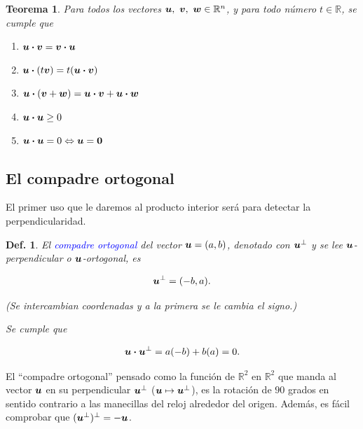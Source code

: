 \documentclass{article}
\theoremstyle{definicion}
\newtheorem{definicion}{Def.}
\theoremstyle{definition}             %
\theoremstyle{definition}             %
\theoremstyle{definition}
\theoremstyle{definition}
\theoremstyle{observacion}
\theoremstyle{definition}
\theoremstyle{plain}
\newtheorem{theorem}{Teorema}
\theoremstyle{definition}
\theoremstyle{afirmacion}
\theoremstyle{notation}
\theoremstyle{definition}
\begin{document}
        \begin{theorem}
            Para todos los vectores \(\vb*{u},\ \vb*{v},\ \vb*{w} \in \mathbb{R}^{n}\), y para todo número \(t \in \mathbb{R}\), se cumple que

            \begin{enumerate}[label = \textnormal{\Roman*)}]
                \item \(\vb*{u} \vdot \vb*{v} = \vb*{v} \vdot \vb*{u}\)
                \item \(\vb*{u} \vdot (t\vb*{v}) = t(\vb*{u} \vdot \vb*{v})\)
                \item \(\vb*{u} \vdot (\vb*{v} + \vb*{w}) = \vb*{u} \vdot \vb*{v} + \vb*{u} \vdot \vb*{w}\)
                \item \(\vb*{u} \vdot \vb*{u} \geq 0\)
                \item \(\vb*{u} \vdot \vb*{u} = 0 \Leftrightarrow \vb*{u} = \vb*{0}\)
            \end{enumerate}
        \end{theorem}

        \subsection{El compadre ortogonal}

        El primer uso que le daremos al producto interior será para detectar la perpendicularidad.

        \begin{definicion}
            El \textcolor{blue}{compadre ortogonal} del vector \(\vb*{u} = (a, b)\), denotado con \(\vb*{u}^{\perp}\) y se lee \(\vb*{u}\)-perpendicular o \(\vb*{u}\)-ortogonal, es

            \begin{equation*}
                \vb*{u}^{\perp} = (-b, a).
            \end{equation*}

            (Se intercambian coordenadas y a la primera se le cambia el signo.)

            Se cumple que 

            \begin{equation*}
                \vb*{u} \vdot \vb*{u}^{\perp} = a(-b) + b(a) = 0.
            \end{equation*}
        \end{definicion}

        El ``compadre ortogonal'' pensado como la función de \(\mathbb{R}^{2}\) en \(\mathbb{R}^{2}\) que manda al vector \(\vb*{u}\) en su perpendicular \(\vb*{u}^{\perp}\) (\(\vb*{u} \mapsto \vb*{u}^{\perp}\)), es la rotación de \(90\) grados en sentido contrario a las manecillas del reloj alrededor del origen. Además, es fácil comprobar que \((\vb*{u}^{\perp})^{\perp} = -\vb*{u}\).
\end{document}
